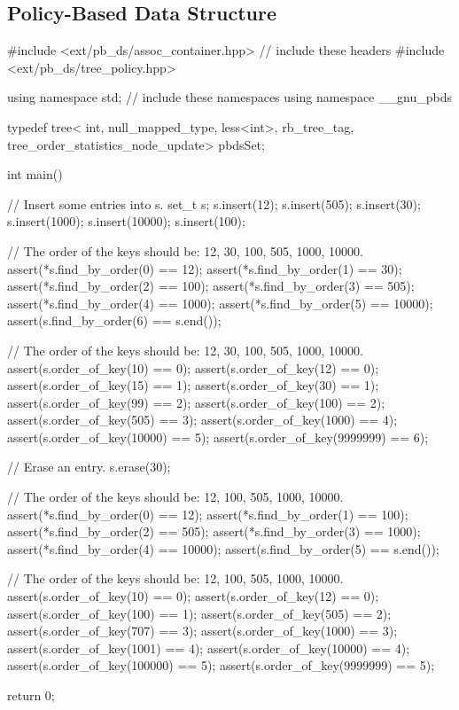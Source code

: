 \documentclass{article}
\begin{document}
\subsection{Policy-Based Data Structure}
\begin{mylisting}{}
#include <ext/pb_ds/assoc_container.hpp>	// include these headers
#include <ext/pb_ds/tree_policy.hpp>

using namespace std;	// include these namespaces
using namespace __gnu_pbds

typedef tree<
  int,
  null_mapped_type,
  less<int>,
  rb_tree_tag,
  tree_order_statistics_node_update> pbdsSet;
  
int main()
{
  // Insert some entries into s.
  set_t s;
  s.insert(12);
  s.insert(505);
  s.insert(30);
  s.insert(1000);
  s.insert(10000);
  s.insert(100);

  // The order of the keys should be: 12, 30, 100, 505, 1000, 10000.
  assert(*s.find_by_order(0) == 12);
  assert(*s.find_by_order(1) == 30);
  assert(*s.find_by_order(2) == 100);
  assert(*s.find_by_order(3) == 505);
  assert(*s.find_by_order(4) == 1000);
  assert(*s.find_by_order(5) == 10000);
  assert(s.find_by_order(6) == s.end());

  // The order of the keys should be: 12, 30, 100, 505, 1000, 10000.
  assert(s.order_of_key(10) == 0);
  assert(s.order_of_key(12) == 0);
  assert(s.order_of_key(15) == 1);
  assert(s.order_of_key(30) == 1);
  assert(s.order_of_key(99) == 2);
  assert(s.order_of_key(100) == 2);
  assert(s.order_of_key(505) == 3);
  assert(s.order_of_key(1000) == 4);
  assert(s.order_of_key(10000) == 5);
  assert(s.order_of_key(9999999) == 6);

  // Erase an entry.
  s.erase(30);

  // The order of the keys should be: 12, 100, 505, 1000, 10000.
  assert(*s.find_by_order(0) == 12);
  assert(*s.find_by_order(1) == 100);
  assert(*s.find_by_order(2) == 505);
  assert(*s.find_by_order(3) == 1000);
  assert(*s.find_by_order(4) == 10000);
  assert(s.find_by_order(5) == s.end());

  // The order of the keys should be: 12, 100, 505, 1000, 10000.
  assert(s.order_of_key(10) == 0);
  assert(s.order_of_key(12) == 0);
  assert(s.order_of_key(100) == 1);
  assert(s.order_of_key(505) == 2);
  assert(s.order_of_key(707) == 3);
  assert(s.order_of_key(1000) == 3);
  assert(s.order_of_key(1001) == 4);
  assert(s.order_of_key(10000) == 4);
  assert(s.order_of_key(100000) == 5);
  assert(s.order_of_key(9999999) == 5);

  return 0;
}
\end{mylisting}
\end{document}

